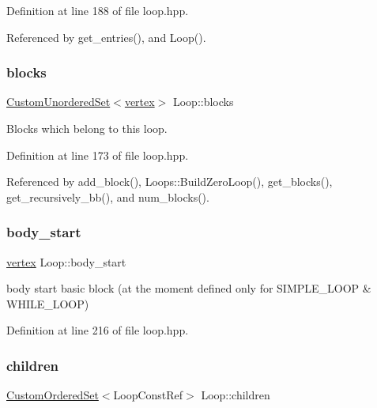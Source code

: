 Definition at line 188 of file loop.\+hpp.



Referenced by get\+\_\+entries(), and Loop().

\mbox{\label{classLoop_a3d39b106d02938689930f6295662ea75}} 
\subsubsection{\texorpdfstring{blocks}{blocks}}
{\footnotesize\ttfamily \hyperlink{classCustomUnorderedSet}{Custom\+Unordered\+Set}$<$\hyperlink{graph_8hpp_abefdcf0544e601805af44eca032cca14}{vertex}$>$ Loop\+::blocks\hspace{0.3cm}{\ttfamily [private]}}



Blocks which belong to this loop. 



Definition at line 173 of file loop.\+hpp.



Referenced by add\+\_\+block(), Loops\+::\+Build\+Zero\+Loop(), get\+\_\+blocks(), get\+\_\+recursively\+\_\+bb(), and num\+\_\+blocks().

\mbox{\label{classLoop_a5ca51d72db12762959560dabdca7b46d}} 
\subsubsection{\texorpdfstring{body\+\_\+start}{body\_start}}
{\footnotesize\ttfamily \hyperlink{graph_8hpp_abefdcf0544e601805af44eca032cca14}{vertex} Loop\+::body\+\_\+start}



body start basic block (at the moment defined only for S\+I\+M\+P\+L\+E\+\_\+\+L\+O\+OP \& W\+H\+I\+L\+E\+\_\+\+L\+O\+OP) 



Definition at line 216 of file loop.\+hpp.

\mbox{\label{classLoop_a7bdbddbc6bdb106b481d29c618299910}} 
\subsubsection{\texorpdfstring{children}{children}}
{\footnotesize\ttfamily \hyperlink{classCustomOrderedSet}{Custom\+Ordered\+Set}$<$Loop\+Const\+Ref$>$ Loop\+::children\hspace{0.3cm}{\ttfamily [private]}}



